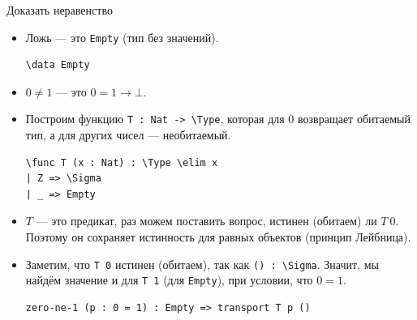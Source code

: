 \documentclass[aspectratio=169]{beamer}
\begin{document}
\begin{frame}[fragile]{Доказать неравенство}
\begin{itemize}
\item Ложь --- это \verb!Empty! (тип без значений).
\small\color[HTML]{025002}
\begin{verbatim}
\data Empty
\end{verbatim}\normalsize
\color{black}
\item $0 \ne 1$ --- это $0 = 1 \rightarrow \bot$.
\item Построим функцию \verb!T : Nat -> \Type!, которая для 0 возвращает обитаемый тип, а для других чисел --- необитаемый.
\small\color[HTML]{025002}\begin{verbatim}
\func T (x : Nat) : \Type \elim x
| Z => \Sigma
| _ => Empty
\end{verbatim}\normalsize
\color{black}
\item $T$ --- это предикат, раз можем поставить вопрос, истинен (обитаем) ли $T\ 0$. Поэтому он сохраняет истинность для равных объектов
(принцип Лейбница).
\item Заметим, что \verb!T 0! истинен (обитаем), так как \verb!() : \Sigma!. Значит, мы найдём значение и для \verb!T 1! (для \verb!Empty!), при условии, что $0 = 1$.
\small\color[HTML]{025002}\begin{verbatim}
zero-ne-1 (p : 0 = 1) : Empty => transport T p ()
\end{verbatim}\normalsize
\color{black}
\end{itemize}
\end{frame}
\end{document}
